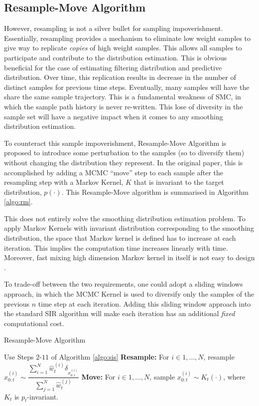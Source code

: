 \subsection{Resample-Move Algorithm}
\label{sec:rm}
However, resampling is not a silver bullet for sampling impoverishment. Essentially, resampling provides a mechanism to eliminate low weight samples to give way to replicate \emph{copies} of high weight samples. This allows all samples to participate and contribute to the distribution estimation. This is obvious beneficial for the case of estimating filtering distribution and predictive distribution. Over time, this replication results in decrease in the number of distinct samples for previous time steps. Eventually, many samples will have the share the same sample trajectory. This is a fundamental weakness of SMC, in which the sample path history is never re-written. This lose of diversity in the sample set will have a negative impact when it comes to any smoothing distribution estimation. 

To counteract this sample impoverishment, Resample-Move Algorithm \cite{BC01, WG01} is proposed to introduce some perturbation to the samples (so to diversify them) without changing the distribution they represent. In the original paper, this is accomplished by adding a MCMC ``move'' step to each sample after the resampling step with a Markov Kernel, $K$ that is invariant to the target distribution, $p(\cdot)$. This Resample-Move algorithm is summarised in Algorithm \ref{algo:rm}.

This does not entirely solve the smoothing distribution estimation problem. To apply Markov Kernels with invariant distribution corresponding to the smoothing distribution, the space that Markov kernel is defined has to increase at each iteration. This implies the computation time increases linearly with time. Moreover, fast mixing high dimension Markov kernel in itself is not easy to design \cite{JAM10}.

To trade-off between the two requirements, one could adopt a sliding windows approach, in which the MCMC Kernel is used to diversify only the samples of the previous $n$ time step at each iteration. Adding this sliding window approach into the standard SIR algorithm will make each iteration has an additional \emph{fixed} computational cost.

\begin{algorithm}
\caption{Resample-Move Algorithm}\label{algo:rm}
\begin{algorithmic}[1]
\State Use Steps $2$-$11$ of Algorithm \ref{algo:sis}
\State \textbf{Resample:} For $i \in 1, \ldots, N$, resample $ x^{(i)}_{0:t} \sim \dfrac{\sum^N_{i=1}\hat{w}^{(i)}_t\delta_{x^{(i)}_{0:t}}}{\sum^N_{j=1} \hat{w}^{(j)}_t}$
\State \textbf{Move:} For $i \in 1, \ldots, N$, sample $x^{(i)}_{0:t} \sim K_t(\cdot)$, where $K_t$ is $p_t$-invariant.
\EndFunction
\end{algorithmic}
\end{algorithm}

